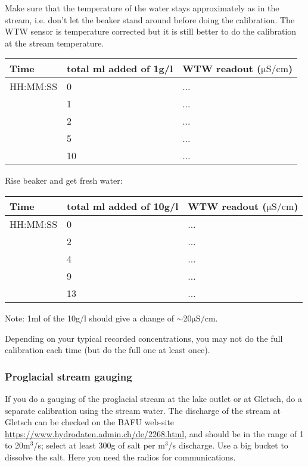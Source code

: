 \documentclass[DIV=15,halfparskip,11pt,headinclude]{scrartcl}
\begin{document}
Make sure that the temperature of the water stays approximately as in
the stream, i.e. don't let the beaker stand around before doing the
calibration.  The WTW sensor is temperature corrected but it is still
better to do the calibration at the stream temperature.

\begin{center}
\begin{tabular}{lll}
Time & total ml added of {\bf 1g/l}  & WTW readout ($\mathrm{\mu S/cm}$)\\
\hline
HH:MM:SS &0  & ... \\ %
&1 & ...\\   %
&2 & ...\\   %
&5 & ... \\  %
&10 & ... \\ %
\end{tabular}
\end{center}

Rise beaker and get fresh water:

\begin{center}
\begin{tabular}{lll}
Time & total ml added of {\bf 10g/l}  & WTW readout ($\mathrm{\mu S/cm}$)\\
\hline
HH:MM:SS &0  & ... \\ %
&2 & ...\\  %
&4 & ... \\ %
&9 & ... \\ %
&13 & ... \\ %
\end{tabular}
\end{center}

Note: 1ml of the 10g/l should give a change of $\sim$20$\mathrm{\mu S/cm}$.

Depending on your typical recorded concentrations, you may not do the
full calibration each time (but do the full one at least once).

\subsubsection{Proglacial stream gauging}

If you do a gauging of the proglacial stream at the lake outlet or at
Gletsch, do a separate calibration using the stream water.  The
discharge of the stream at Gletsch can be checked on the BAFU web-site
\url{https://www.hydrodaten.admin.ch/de/2268.html}, and should be in
the range of 1 to 20m$^3$/s; select at least 300g of salt per m$^3$/s
discharge.  Use a big bucket to dissolve the salt.  Here you need the
radios for communications.
\end{document}
